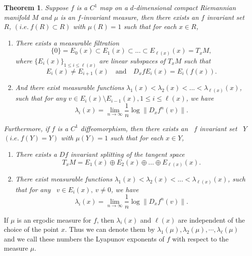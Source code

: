 \documentclass[11pt,a4paper]{amsart}
\theoremstyle{plain}
\newtheorem{Thm}{Theorem}[section]
\theoremstyle{remark}
\begin{document}
	\begin{Thm} \cite{Oseledets} Suppose $f$ is  a  $C^{1}$ map on a $d$-dimensional compact Riemannian manifold $M$ and $\mu$ is an  $f$-invariant measure, then there exists an $f$ invariant set  $R$, $(i.e.~ f(R)\subset R)$ with $\mu(R)=1$ such that for each $x\in R$,
		\begin{enumerate}
			\item  There exists a measurable filtration
			\begin{displaymath}
				\{0\}=E_{0}(x)\subset E_{1}(x)\subset...\subset E_{\ell(x)}(x)=T_{x}M,
			\end{displaymath}
			where $\{E_{i}(x)\}_{1\leq i\leq \ell(x)}$ are linear subspaces of $T_{x}M$ such that
			\begin{displaymath}
				E_{i}(x)\neq E_{i+1}(x)\quad \text{and} \quad D_{x}f E_{i}(x)=E_{i}(f(x)).
			\end{displaymath}
			\item And there exist measurable functions $\lambda_{1}(x)<\lambda_{2}(x)<...<\lambda_{\ell(x)}(x)$, such that for any $v\in E_{i}(x)\setminus E_{i-1}(x), 1\leq i\leq \ell(x)$, we have~$$\lambda_{i}(x)=\lim_{n\rightarrow \infty}\frac{1}{n}\log\|D_{x}f^{n}(v)\|.$$
		\end{enumerate}
		
		Furthermore, if $f$ is a $C^{1}$ diffeomorphism, then  there exists an ~$f$ invariant set ~$Y$ $(i.e.~f(Y)=Y)$ with $\mu(Y)=1$ such that for each $x\in Y$,
		\begin{enumerate}
			\item There exists a $Df$ invariant splitting of the tangent space
			\begin{displaymath}
				T_{x}M=E_{1}(x)\oplus E_{2}(x)\oplus...\oplus E_{\ell(x)}(x).
			\end{displaymath}
			\item There exist measurable functions $\lambda_{1}(x)<\lambda_{2}(x)<...<\lambda_{\ell(x)}(x)$, such that for any ~$v\in E_{i}(x), ~v\neq 0$, we have~$$\lambda_{i}(x)=\lim_{n\rightarrow \infty}\frac{1}{n}\log\|D_{x}f^{n}(v)\|.$$
		\end{enumerate}
	\end{Thm}
	
	If $\mu$ is an ergodic measure for $f$, then $\lambda_{i}(x)$ and $\ell(x)$ are independent of the choice of the point $x$. Thus we can denote them by $\lambda_{1}(\mu), \lambda_{2}(\mu), \cdots,  \lambda_{\ell}(\mu)$ and we call these numbers the Lyapunov exponents of $f$ with respect to the measure $\mu$.
	
\end{document}
